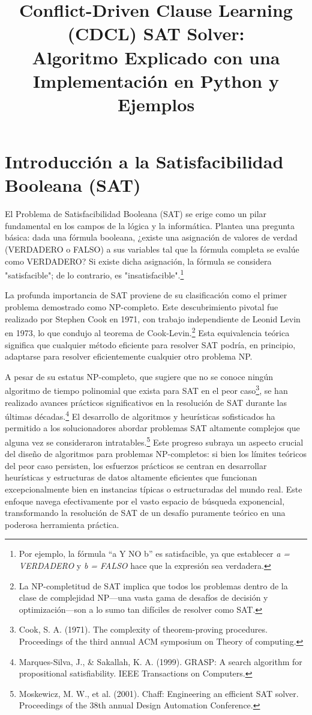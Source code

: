 \documentclass{article}
\title{Conflict-Driven Clause Learning (CDCL) SAT Solver:\\ Algoritmo Explicado con una Implementación en Python y Ejemplos}
\author{}
\date{}
\begin{document}
\maketitle

\section{Introducción a la Satisfacibilidad Booleana (SAT)}

El Problema de Satisfacibilidad Booleana (SAT) se erige como un pilar fundamental en los campos de la lógica y la informática. Plantea una pregunta básica: dada una fórmula booleana, ¿existe una asignación de valores de verdad (VERDADERO o FALSO) a sus variables tal que la fórmula completa se evalúe como VERDADERO? Si existe dicha asignación, la fórmula se considera "satisfacible"; de lo contrario, es "insatisfacible".\footnote{Por ejemplo, la fórmula ``a Y NO b'' es satisfacible, ya que establecer \textit{a = VERDADERO} y \textit{b = FALSO} hace que la expresión sea verdadera.}

La profunda importancia de SAT proviene de su clasificación como el primer problema demostrado como NP-completo. Este descubrimiento pivotal fue realizado por Stephen Cook en 1971, con trabajo independiente de Leonid Levin en 1973, lo que condujo al teorema de Cook-Levin.\footnote{La NP-completitud de SAT implica que todos los problemas dentro de la clase de complejidad NP—una vasta gama de desafíos de decisión y optimización—son a lo sumo tan difíciles de resolver como SAT.} Esta equivalencia teórica significa que cualquier método eficiente para resolver SAT podría, en principio, adaptarse para resolver eficientemente cualquier otro problema NP.

A pesar de su estatus NP-completo, que sugiere que no se conoce ningún algoritmo de tiempo polinomial que exista para SAT en el peor caso\footnote{Cook, S. A. (1971). The complexity of theorem-proving procedures. Proceedings of the third annual ACM symposium on Theory of computing.}, se han realizado avances prácticos significativos en la resolución de SAT durante las últimas décadas.\footnote{Marques-Silva, J., \& Sakallah, K. A. (1999). GRASP: A search algorithm for propositional satisfiability. IEEE Transactions on Computers.} El desarrollo de algoritmos y heurísticas sofisticados ha permitido a los solucionadores abordar problemas SAT altamente complejos que alguna vez se consideraron intratables.\footnote{Moskewicz, M. W., et al. (2001). Chaff: Engineering an efficient SAT solver. Proceedings of the 38th annual Design Automation Conference.} Este progreso subraya un aspecto crucial del diseño de algoritmos para problemas NP-completos: si bien los límites teóricos del peor caso persisten, los esfuerzos prácticos se centran en desarrollar heurísticas y estructuras de datos altamente eficientes que funcionan excepcionalmente bien en instancias típicas o estructuradas del mundo real. Este enfoque navega efectivamente por el vasto espacio de búsqueda exponencial, transformando la resolución de SAT de un desafío puramente teórico en una poderosa herramienta práctica.
\end{document}
